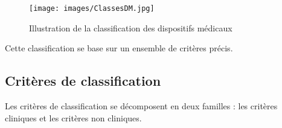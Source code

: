 \begin{figure}[htbp]%
\begin{center}
\texttt{[image: images/ClassesDM.jpg]} 
\end{center}
\caption{Illustration de la classification des dispositifs médicaux}
\label{Illustration de la classification des dispositifs medicaux}
\end{figure}

Cette classification se base sur un ensemble de critères précis.

\subsection{Critères de classification}

Les critères de classification se décomposent en deux familles : les critères cliniques et les critères non cliniques.
